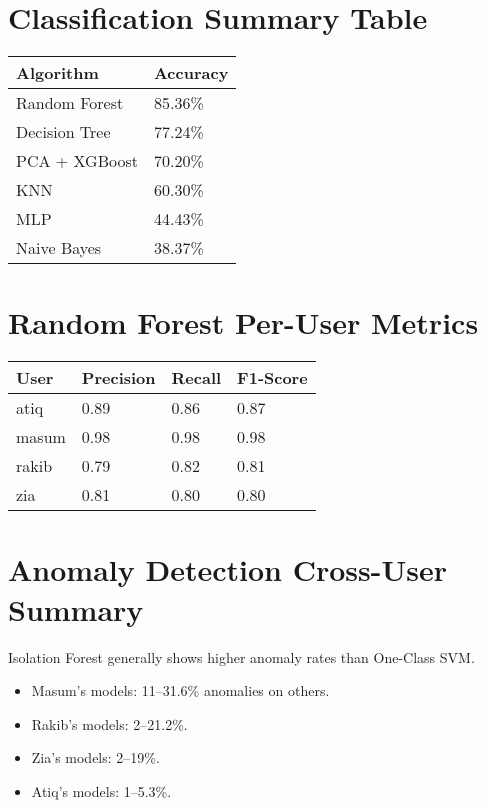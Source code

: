 \documentclass[
  12pt,
  a4paper,
]{report}
\providecommand{\tightlist}{%
  \setlength{\itemsep}{0pt}\setlength{\parskip}{0pt}}
\begin{document}
\section{Classification Summary
Table}\label{classification-summary-table}

\begin{longtable}[]{@{}ll@{}}
\toprule\noalign{}
Algorithm & Accuracy \\
\midrule\noalign{}
\endhead
\bottomrule\noalign{}
\endlastfoot
Random Forest & 85.36\% \\
Decision Tree & 77.24\% \\
PCA + XGBoost & 70.20\% \\
KNN & 60.30\% \\
MLP & 44.43\% \\
Naive Bayes & 38.37\% \\
\end{longtable}

\section{Random Forest Per-User
Metrics}\label{random-forest-per-user-metrics}

\begin{longtable}[]{@{}llll@{}}
\toprule\noalign{}
User & Precision & Recall & F1-Score \\
\midrule\noalign{}
\endhead
\bottomrule\noalign{}
\endlastfoot
atiq & 0.89 & 0.86 & 0.87 \\
masum & 0.98 & 0.98 & 0.98 \\
rakib & 0.79 & 0.82 & 0.81 \\
zia & 0.81 & 0.80 & 0.80 \\
\end{longtable}

\section{Anomaly Detection Cross-User
Summary}\label{anomaly-detection-cross-user-summary}

Isolation Forest generally shows higher anomaly rates than One-Class
SVM.

\begin{itemize}
\tightlist
\item
  Masum's models: 11--31.6\% anomalies on others.
\item
  Rakib's models: 2--21.2\%.
\item
  Zia's models: 2--19\%.
\item
  Atiq's models: 1--5.3\%.
\end{itemize}
\end{document}
